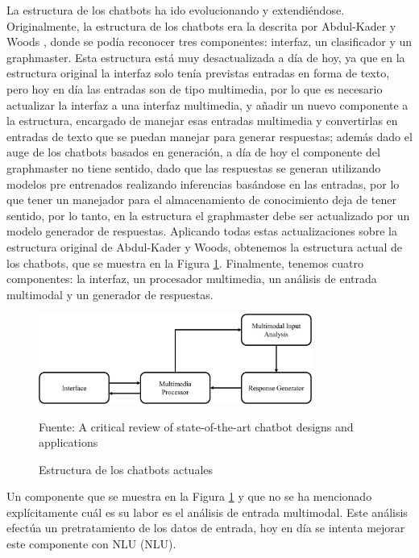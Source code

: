 La estructura de los chatbots ha ido evolucionando y extendiéndose. Originalmente, la estructura de los chatbots era la descrita por Abdul-Kader y Woods \cite{RefWorks:RefID:36-luo2022critical}, donde se podía reconocer tres componentes: interfaz, un clasificador y un graphmaster. Esta estructura está muy desactualizada a día de hoy, ya que en la estructura original la interfaz solo tenía previstas entradas en forma de texto, pero hoy en día las entradas son de tipo multimedia, por lo que es necesario actualizar la interfaz a una interfaz multimedia, y añadir un nuevo componente a la estructura, encargado de manejar esas entradas multimedia y convertirlas en entradas de texto que se puedan manejar para generar respuestas; además dado el auge de los chatbots basados en generación, a día de hoy el componente del graphmaster no tiene sentido, dado que las respuestas se generan utilizando modelos pre entrenados realizando inferencias basándose en las entradas, por lo que tener un manejador para el almacenamiento de conocimiento deja de tener sentido, por lo tanto, en la estructura el graphmaster debe ser actualizado por un modelo generador de respuestas. Aplicando todas estas actualizaciones sobre la estructura original de Abdul-Kader y Woods, obtenemos la estructura actual de los chatbots, que se muestra en la Figura \ref{fig:estructura_state_of_art}. Finalmente, tenemos cuatro componentes: la interfaz, un procesador multimedia, un análisis de entrada multimodal y un generador de respuestas.

\begin{figure}[h]
\centering
\includegraphics[width=0.8\textwidth]{imagenes/02_EstadoDelArte/estructura_state_of_art.jpg}
\begin{center}
Fuente: A critical review of state-of-the-art chatbot designs and applications \cite{RefWorks:RefID:36-luo2022critical}
\end{center}
\caption{Estructura de los chatbots actuales}
\label{fig:estructura_state_of_art}
\end{figure}

Un componente que se muestra en la Figura \ref{fig:estructura_state_of_art} y que no se ha mencionado explícitamente cuál es su labor es el análisis de entrada multimodal. Este análisis efectúa un pretratamiento de los datos de entrada, hoy en día se intenta mejorar este componente con \gls{NLU} (NLU).

